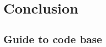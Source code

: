 \documentclass[a4paper,11pt,twoside]{report}
\begin{document}
\chapter{Conclusion}
\label{ch:conclusions}




\appendix

\begin{appendices}
\chapter{Guide to code base}

\end{appendices}

{}
\printbibliography        
\end{document}

